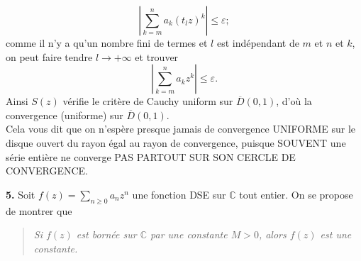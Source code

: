 \documentclass[a4paper,10pt]{article}
\newcommand{\C}{\mathbb{C}}
\newcommand{\abs}[1]{\left|#1\right|}
\newcommand{\comment}[1]{{\color{blue}#1}}
\begin{document}
\begin{enumerate}[label=\alph*)]
{    $$\abs{\sum_{k=m}^na_k\left(t_lz\right)^k}\leq\varepsilon;$$
    comme il n'y a qu'un nombre fini de termes et $l$ est indépendant de $m$ et $n$ et $k$, on peut faire tendre $l\to+\infty$ et trouver
    $$\abs{\sum_{k=m}^na_kz^k}\leq\varepsilon.$$
    Ainsi $S(z)$ vérifie le critère de Cauchy uniform sur $\overline{D}(0,1)$, d'où la convergence (uniforme) sur $\overline{D}(0,1)$.
    }\\
    \comment{Cela vous dit que on n'espère presque jamais de convergence UNIFORME sur le disque ouvert du rayon égal au rayon de convergence, puisque SOUVENT une série entière ne converge PAS PARTOUT SUR SON CERCLE DE CONVERGENCE.}
\end{enumerate}

\vspace{.1in}
\noindent
\textbf{5.}
Soit $f(z)=\sum_{n\geq0}a_nz^n$ une fonction DSE sur $\C$ tout entier. On se propose de montrer que 
\begin{quote}
    \textit{Si $f(z)$ est bornée sur $\C$ par une constante $M>0$, alors $f(z)$ est une constante.}
\end{quote}
\end{document}
